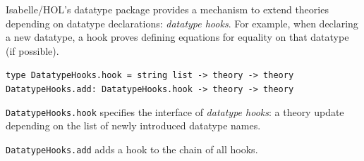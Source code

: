 \begin{isabellebody}
\begin{isamarkuptext}
\begin{description}
  \end{description}%
\end{isamarkuptext}%
\isamarkuptrue%
%
\endisatagmlref
{\isafoldmlref}%
%
\isadelimmlref
%
\endisadelimmlref
%
\isamarkuptrue%
%
\begin{isamarkuptext}%
Isabelle/HOL's datatype package provides a mechanism to
  extend theories depending on datatype declarations:
  \emph{datatype hooks}.  For example, when declaring a new
  datatype, a hook proves defining equations for equality on
  that datatype (if possible).%
\end{isamarkuptext}%
\isamarkuptrue%
%
\isadelimmlref
%
\endisadelimmlref
%
\isatagmlref
%
\begin{isamarkuptext}%
\begin{mldecls}
  \verb|type DatatypeHooks.hook = string list -> theory -> theory| \\
  \verb|DatatypeHooks.add: DatatypeHooks.hook -> theory -> theory|
  \end{mldecls}

  \begin{description}

  \item \verb|DatatypeHooks.hook| specifies the interface
     of \emph{datatype hooks}: a theory update
     depending on the list of newly introduced
     datatype names.

  \item \verb|DatatypeHooks.add| adds a hook to the
     chain of all hooks.


\end{description}
\end{isamarkuptext}
\end{isabellebody}
